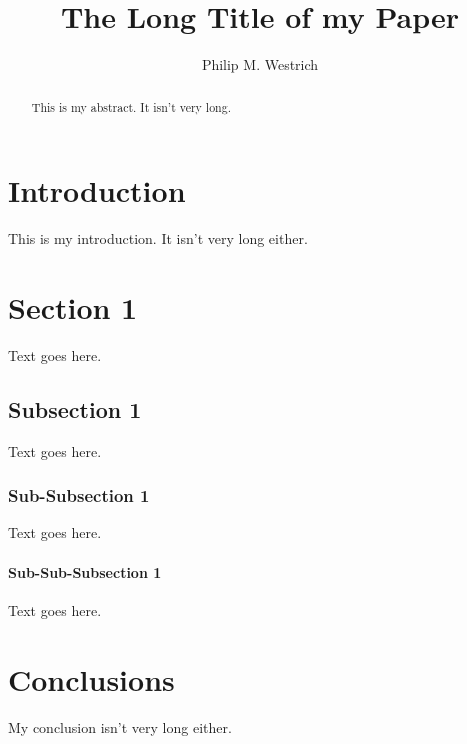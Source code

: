 \documentclass[format=acmsmall, review=false, screen=true]{acmart}
\begin{document}
\title[Short Title]{The Long Title of my Paper}  
\author{Philip M. Westrich}

\begin{abstract}
This is my abstract. It isn't very long. 
\end{abstract}

\maketitle

\section{Introduction}

This is my introduction. It isn't very long either.

\section{Section 1}

Text goes here.

\subsection{Subsection 1}

Text goes here.

\subsubsection{Sub-Subsection 1}

Text goes here.

\paragraph{Sub-Sub-Subsection 1}

Text goes here.

\section{Conclusions}

My conclusion isn't very long either.



\end{document}
